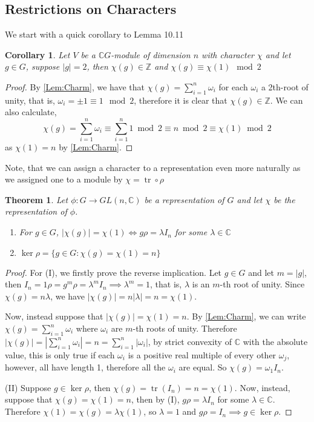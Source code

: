 \documentclass[11pt, notitlepage]{article}
\numberwithin{equation}{section}
\theoremstyle{plain}
\newtheorem{theorem}{Theorem}[section]
\newtheorem{corollary}{Corollary}[theorem]
\theoremstyle{definition}
\newcommand{\C}{\mathbb{C}}
\newcommand{\Z}{\mathbb{Z}}
\DeclareMathOperator{\tr}{tr}
\begin{document}
\subsection{Restrictions on Characters}
We start with a quick corollary to Lemma 10.11
\begin{corollary}
	Let $V$ be a $\mathbb{C}G$-module of dimension $n$ with character $\chi$ and let $g\in G$, suppose $|g|=2$, then $\chi(g)\in \Z$ and $\chi(g)\equiv \chi(1)\mod 2$
\end{corollary}
\begin{proof}
	By \ref{Lem:Charm}, we have that $\chi(g) = \sum_{i=1}^n\omega_i$ for each $\omega_i$ a 2th-root of unity, that is, $\omega_i = \pm 1\equiv 1\mod 2$, therefore it is clear that $\chi(g)\in \Z$. We can also calculate, 
	\[
	\chi(g) = \sum_{i=1}^n\omega_i\equiv \sum_{i=1}^n1 \bmod 2 \equiv n\bmod 2 \equiv \chi(1)\bmod 2
	\]
	as $\chi(1)=n$ by \ref{Lem:Charm}.
\end{proof}
Note, that we can assign a character to a representation even more naturally as we assigned one to a module by $\chi = \tr\circ \rho$
\begin{theorem}
	Let $\phi:G\rightarrow GL(n,\C)$ be a representation of $G$  and let $\chi$ be the representation of $\phi$.
	\begin{enumerate}[label=\emph{(\Roman*)}]
		\item  For $g\in G$, $|\chi(g)| = \chi(1)\iff g\rho = \lambda I_n$ for some $\lambda\in \C$
		\item $\ker \rho = \{g\in G:\chi(g) = \chi(1) = n\}$
	\end{enumerate}
\end{theorem}
\begin{proof}
	For (I), we firstly prove the reverse implication. Let $g\in G$ and let $m = |g|$, then $I_n = 1\rho = g^m\rho = \lambda^mI_n \implies \lambda^m = 1$, that is, $\lambda$ is an $m$-th root of unity. Since $\chi(g) = n\lambda$, we have $|\chi(g)| = n|\lambda| = n = \chi(1)$.
	
	Now, instead suppose that $|\chi(g)| = \chi(1) = n$. By \ref{Lem:Charm}, we can write $\chi(g) = \sum_{i=1}^n\omega_i$ where $\omega_i$ are $m$-th roots of unity. Therefore $|\chi(g)| = |\sum_{i=1}^n\omega_i| = n = \sum_{i=1}^n|\omega_i|$, by strict convexity of $\C$ with the absolute value, this is only true if each $\omega_i$ is a positive real multiple of every other $\omega_j$, however, all have length 1, therefore all the $\omega_i$ are equal. So $\chi(g) = \omega_1I_n$. 
	
	(II) Suppose $g\in \ker\rho$, then $\chi(g) = \tr(I_n) = n = \chi(1)$. Now, instead, suppose that $\chi(g) = \chi(1) = n$, then by (I), $g\rho = \lambda I_n$ for some $\lambda\in \C$. Therefore $\chi(1) = \chi(g) = \lambda\chi(1)$, so $\lambda = 1$ and $g\rho = I_n\implies g\in\ker\rho$.
\end{proof}
\end{document}
